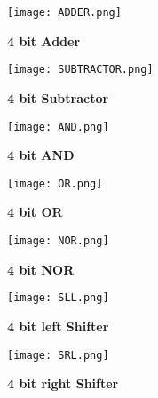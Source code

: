 \documentclass[12pt]{article}
\begin{document}
    \begin{figure}[H]
        \centering
        \texttt{[image: ADDER.png]}
        \caption{\textbf{4 bit Adder}}
        \label{fig:10}
    \end{figure}

   

\begin{multicols}{2}

     \begin{figure}[H]
        \centering
        \texttt{[image: SUBTRACTOR.png]}
        \caption{\textbf{4 bit Subtractor}}
        \label{fig:11}
    \end{figure}

    \begin{figure}[H]
        \centering
        \texttt{[image: AND.png]}
        \caption{\textbf{4 bit AND}}
        \label{fig:12}
    \end{figure}
    
\end{multicols}

\begin{multicols}{2}

     \begin{figure}[H]
        \centering
        \texttt{[image: OR.png]}
        \caption{\textbf{4 bit OR}}
        \label{fig:13}
    \end{figure}

    \begin{figure}[H]
        \centering
        \texttt{[image: NOR.png]}
        \caption{\textbf{4 bit NOR}}
        \label{fig:14}
    \end{figure}
    
\end{multicols}

\begin{multicols}{2}

     \begin{figure}[H]
        \centering
        \texttt{[image: SLL.png]}
        \caption{\textbf{4 bit left Shifter}}
        \label{fig:15}
    \end{figure}

    \begin{figure}[H]
        \centering
        \texttt{[image: SRL.png]}
        \caption{\textbf{4 bit right Shifter}}
        \label{fig:16}
    \end{figure}
    
\end{multicols}
\end{document}
